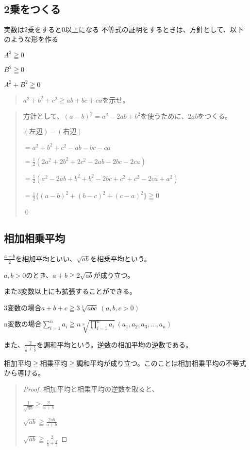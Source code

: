 \documentclass[uplatex,fleqn]{jsbook}
\begin{document}
\subsection{2乗をつくる}
実数は2乗をすると0以上になる
不等式の証明をするときは、方針として、以下のような形を作る

$A^2\geqq 0$

$B^2\geqq 0$

$A^2+B^2\geqq 0$

\begin{quote}
    $a^2+b^2+c^2\geqq ab+bc+ca$を示せ。
\end{quote}

\begin{quote}
    方針として、$\left(a- b\right)^2=a^2-2ab+b^2$を使うために、$2ab$をつくる。

    $\left(\text{左辺}\right)-\left(\text{右辺}\right)$

    $=a^2+b^2+c^2-ab-bc-ca$

    $\displaystyle =\frac{1}{2}\left(2a^2+2b^2+2c^2-2ab-2bc-2ca\right)$

    $\displaystyle =\frac{1}{2}\left(a^2-2ab+b^2+b^2-2bc+c^2+c^2-2ca+a^2\right)$

    $\displaystyle =\frac{1}{2}\{\left(a-b\right)^2+\left(b-c\right)^2+\left(c-a\right)^2\}\geqq 0$

    \qed
\end{quote}

\subsection{相加相乗平均}
$\displaystyle \frac{a+b}{2}$を相加平均といい、$\sqrt{ab}$を相乗平均という。

$a,b>0$のとき、$a+b\geqq2\sqrt{ab}$が成り立つ。

また3変数以上にも拡張することができる。

3変数の場合$a+b+c\geqq 3\sqrt[3]{abc}\ \left(a,b,c>0\right)$

n変数の場合$\displaystyle \sum_{i=1}^n a_i\geqq n\sqrt[n]{\prod_{i=1}^n a_i}\ \left(a_1,a_2,a_3,\dots,a_n\right)$

また、$\displaystyle \frac{2}{\frac{1}{a}+\frac{1}{b}}$を調和平均という。逆数の相加平均の逆数である。

相加平均$\geqq$相乗平均$\geqq$調和平均が成り立つ。このことは相加相乗平均の不等式から導ける。
\begin{quote}
    \begin{proof}
        相加平均と相乗平均の逆数を取ると、

        $\displaystyle \frac{1}{\sqrt{ab}}\geqq\frac{2}{a+b}$

        $\displaystyle \sqrt{ab}\geqq\frac{2ab}{a+b}$

        $\displaystyle \sqrt{ab}\geqq\frac{2}{\frac{1}{a}+\frac{1}{b}}$
    \end{proof}
\end{quote}
\end{document}
